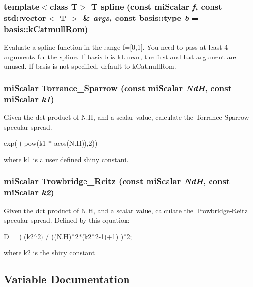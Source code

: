 \subsubsection{\setlength{\rightskip}{0pt plus 5cm}template$<$class T$>$ T spline (const mi\-Scalar {\em f}, const std::vector$<$ T $>$ \& {\em args}, const basis::type {\em b} = basis::k\-Catmull\-Rom)\hspace{0.3cm}{\tt  [inline]}}\label{namespacemr_a79}


Evaluate a spline function in the range f=[0,1]. You need to pass at least 4 arguments for the spline. If basis b is k\-Linear, the first and last argument are unused. If basis is not specified, default to k\-Catmull\-Rom. 
\subsubsection{\setlength{\rightskip}{0pt plus 5cm}mi\-Scalar Torrance\_\-Sparrow (const mi\-Scalar {\em Nd\-H}, const mi\-Scalar {\em k1})\hspace{0.3cm}{\tt  [inline]}}\label{namespacemr_a75}


Given the dot product of N.H, and a scalar value, calculate the Torrance-Sparrow specular spread.

exp(-( pow(k1 $\ast$ acos(N.H)),2))

where k1 is a user defined shiny constant. 
\subsubsection{\setlength{\rightskip}{0pt plus 5cm}mi\-Scalar Trowbridge\_\-Reitz (const mi\-Scalar {\em Nd\-H}, const mi\-Scalar {\em k2})\hspace{0.3cm}{\tt  [inline]}}\label{namespacemr_a74}


Given the dot product of N.H, and a scalar value, calculate the Trowbridge-Reitz specular spread. Defined by this equation:

D = ( (k2$^\wedge$2) / ((N.H)$^\wedge$2$\ast$(k2$^\wedge$2-1)+1) )$^\wedge$2;

where k2 is the shiny constant 

\subsection{Variable Documentation}
